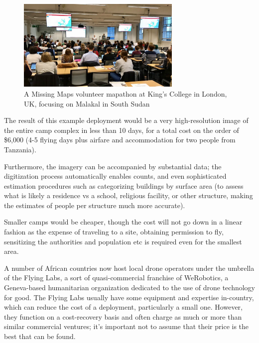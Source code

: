 \documentclass[a4paper,12pt,twoside]{article}
\begin{document}
\begin{figure}[H]
    \centering
    \includegraphics[width=0.7\textwidth]{images/MissingMapsMappingParty.png}
    \caption{A Missing Maps volunteer mapathon at King's College in London, UK, focusing on Malakal in South Sudan}
    \label{fig:Missing Maps Mapathon}
\end{figure}

The result of this example deployment would be a very high-resolution image of the entire camp complex in less than 10 days, for a total cost on the order of \$6,000 (4-5 flying days plus airfare and accommodation for two people from Tanzania). 

Furthermore, the imagery can be accompanied by substantial data; the digitization process automatically enables counts, and even sophisticated estimation procedures such as categorizing buildings by surface area (to assess what is likely a residence vs a school, religious facility, or other structure, making the estimates of people per structure much more accurate). 

Smaller camps would be cheaper, though the cost will not go down in a linear fashion as the expense of traveling to a site, obtaining permission to fly, sensitizing the authorities and population etc is required even for the smallest area. 

A number of African countries now host local drone operators under the umbrella of the Flying Labs, a sort of quasi-commercial franchise of WeRobotics, a Geneva-based humanitarian organization dedicated to the use of drone technology for good. The Flying Labs usually have some equipment and expertise in-country, which can reduce the cost of a deployment, particularly a small one. However, they function on a cost-recovery basis and often charge as much or more than similar commercial ventures; it's important not to assume that their price is the best that can be found.
\end{document}

